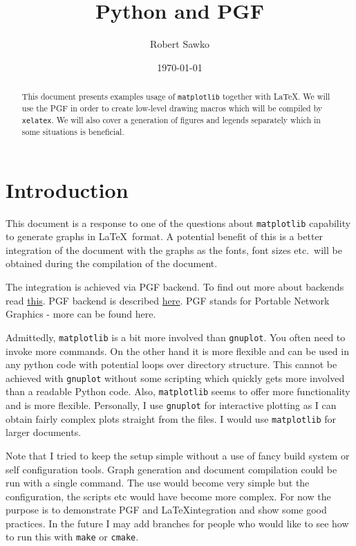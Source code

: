 \documentclass[a4paper,12pt]{article}
\date{\today}
\author{Robert Sawko}
\affil{Department of Engineering Computing, Cranfield University}
\title{Python and PGF}
\begin{document}
\maketitle

\begin{abstract}

  This document presents examples usage of \texttt{matplotlib} together with
  \LaTeX. We will use the PGF in order to create low-level drawing macros which
  will be compiled by \texttt{xelatex}. We will also cover a generation of
  figures and legends separately which in some situations is beneficial. 
\end{abstract}

\section{Introduction}
This document is a response to one of the questions about \texttt{matplotlib}
capability to generate graphs in \LaTeX\ format. A potential benefit of this is
a better integration of the document with the graphs as the fonts, font sizes
etc.\ will be obtained during the compilation of the document. 

The integration is achieved via PGF backend. To find out more about backends
read \href{http://matplotlib.org/faq/usage_faq.html#what-is-a-backend}{this}.
PGF backend is described \href{http://matplotlib.org/users/pgf.html}{here}. PGF
stands for Portable Network Graphics - more can be found here.

Admittedly, \texttt{matplotlib} is a bit more involved than \texttt{gnuplot}.
You often need to invoke more commands. On the other hand it is more flexible
and can be used in any python code with potential loops over directory
structure. This cannot be achieved with \texttt{gnuplot} without some scripting
which quickly gets more involved than a readable Python code. Also,
\texttt{matplotlib} seems to offer more functionality and is more flexible.
Personally, I use \texttt{gnuplot} for interactive plotting as I can obtain
fairly complex plots straight from the files. I would use \texttt{matplotlib}
for larger documents.

Note that I tried to keep the setup simple without a use of fancy build system
or self configuration tools. Graph generation and document compilation could be
run with a single command. The use would become very simple but the
configuration, the scripts etc would have become more complex. For now the
purpose is to demonstrate PGF and \LaTeX integration and show some good
practices. In the future I may add branches for people who would like to see how
to run this with \texttt{make} or \texttt{cmake}.
\end{document}
